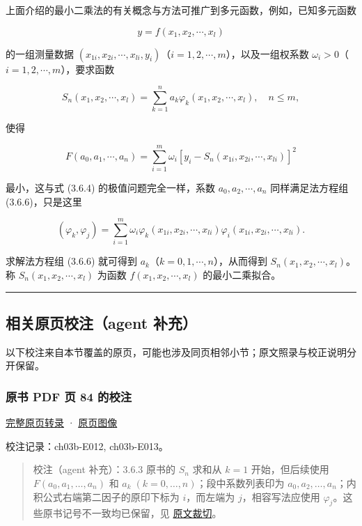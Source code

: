 \documentclass[
  10pt,
  fontset=fandol]{ctexart}
\begin{document}
上面介绍的最小二乘法的有关概念与方法可推广到多元函数，例如，已知多元函数

\[
y=f(x_1,x_2,\cdots,x_l)
\]

的一组测量数据 \((x_{1i},x_{2i},\cdots,x_{li},y_i)\)（\(i=1,2,\cdots,m\)），以及一组权系数 \(\omega_i>0\)（\(i=1,2,\cdots,m\)），要求函数

\[
S_n(x_1,x_2,\cdots,x_l)=\sum_{k=1}^na_k\varphi_k(x_1,x_2,\cdots,x_l),\quad n\leqslant m,
\]

使得

\[
F(a_0,a_1,\cdots,a_n)=\sum_{i=1}^m\omega_i[y_i-S_n(x_{1i},x_{2i},\cdots,x_{li})]^2
\]

最小，这与式 (3.6.4) 的极值问题完全一样，系数 \(a_0,a_2,\cdots,a_n\) 同样满足法方程组 (3.6.6)，只是这里

\[
(\varphi_k,\varphi_j)=\sum_{i=1}^m\omega_i\varphi_k(x_{1i},x_{2i},\cdots,x_{li})\varphi_i(x_{1i},x_{2i},\cdots,x_{li}).
\]

求解法方程组 (3.6.6) 就可得到 \(a_k\)（\(k=0,1,\cdots,n\)），从而得到 \(S_n(x_1,x_2,\cdots,x_l)\)。称 \(S_n(x_1,x_2,\cdots,x_l)\) 为函数 \(f(x_1,x_2,\cdots,x_l)\) 的最小二乘拟合。

\begin{center}\rule{0.5\linewidth}{0.5pt}\end{center}

\subsection{相关原页校注（agent 补充）}\label{ux76f8ux5173ux539fux9875ux6821ux6ce8agent-ux8865ux5145}

以下校注来自本节覆盖的原页，可能也涉及同页相邻小节；原文照录与校正说明分开保留。

\subsubsection{原书 PDF 页 84 的校注}\label{ux539fux4e66-pdf-ux9875-84-ux7684ux6821ux6ce8}

\href{../pages/pdf-084.md}{完整原页转录} · \href{../../source-images/pdf-084.jpeg}{原页图像}

校注记录：ch03b-E012, ch03b-E013。

\begin{quote}
校注（agent 补充）：3.6.3 原书的 \(S_n\) 求和从 \(k=1\) 开始，但后续使用 \(F(a_0,a_1,\ldots,a_n)\) 和 \(a_k\;(k=0,\ldots,n)\)；段中系数列表印为 \(a_0,a_2,\ldots,a_n\)；内积公式右端第二因子的原印下标为 \(i\)，而左端为 \(j\)，相容写法应使用 \(\varphi_j\)。这些原书记号不一致均已保留，见 \href{../assets/ch03b/p084-multivariate-formulas.png}{原文裁切}。
\end{quote}
\end{document}
